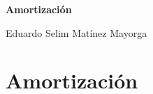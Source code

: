 





\begin{titlingpage} %

    \raggedleft %
	
	\vspace*{\baselineskip} %
	
	\vspace*{0.25\textheight} %
	
    
    \vspace*{0.1\textheight}

    {\Huge{\textbf{Amortización}}}\\[\baselineskip] %
    \vspace*{0.1\textheight}

    
    {\Large Eduardo Selim Matínez Mayorga}\\[\baselineskip]
	
	\vfill

\end{titlingpage}

\thispagestyle{empty}

\chapter*{Amortización}

